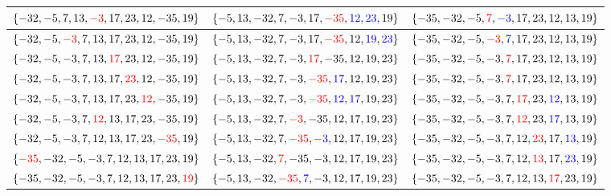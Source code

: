 \begin{longtable}{*{3}{|p{0.31\textwidth}}|}
\hline
\arrayfontsize $\{-32, -5, 7, 13, \textcolor{red}{-3}, 17, 23, 12, -35, 19\}$ & \arrayfontsize $\{-5, 13, -32, 7, -3, 17, \textcolor{red}{-35}, \textcolor{blue}{12}, \textcolor{blue}{23}, 19\}$ & \arrayfontsize $\{-35, -32, -5, \textcolor{red}{7}, \textcolor{blue}{-3}, 17, 23, 12, 13, 19\}$ \\
\hline
\arrayfontsize $\{-32, -5, \textcolor{red}{-3}, 7, 13, 17, 23, 12, -35, 19\}$ & \arrayfontsize $\{-5, 13, -32, 7, -3, 17, \textcolor{red}{-35}, 12, \textcolor{blue}{19}, \textcolor{blue}{23}\}$ & \arrayfontsize $\{-35, -32, -5, \textcolor{red}{-3}, \textcolor{blue}{7}, 17, 23, 12, 13, 19\}$ \\
\hline
\arrayfontsize $\{-32, -5, -3, 7, 13, \textcolor{red}{17}, 23, 12, -35, 19\}$ & \arrayfontsize $\{-5, 13, -32, 7, -3, \textcolor{red}{17}, -35, 12, 19, 23\}$ & \arrayfontsize $\{-35, -32, -5, -3, \textcolor{red}{7}, 17, 23, 12, 13, 19\}$ \\
\hline
\arrayfontsize $\{-32, -5, -3, 7, 13, 17, \textcolor{red}{23}, 12, -35, 19\}$ & \arrayfontsize $\{-5, 13, -32, 7, -3, \textcolor{red}{-35}, \textcolor{blue}{17}, 12, 19, 23\}$ & \arrayfontsize $\{-35, -32, -5, -3, \textcolor{red}{7}, 17, 23, 12, 13, 19\}$ \\
\hline
\arrayfontsize $\{-32, -5, -3, 7, 13, 17, 23, \textcolor{red}{12}, -35, 19\}$ & \arrayfontsize $\{-5, 13, -32, 7, -3, \textcolor{red}{-35}, \textcolor{blue}{12}, \textcolor{blue}{17}, 19, 23\}$ & \arrayfontsize $\{-35, -32, -5, -3, 7, \textcolor{red}{17}, 23, \textcolor{blue}{12}, 13, 19\}$ \\
\hline
\arrayfontsize $\{-32, -5, -3, 7, \textcolor{red}{12}, 13, 17, 23, -35, 19\}$ & \arrayfontsize $\{-5, 13, -32, 7, \textcolor{red}{-3}, -35, 12, 17, 19, 23\}$ & \arrayfontsize $\{-35, -32, -5, -3, 7, \textcolor{red}{12}, 23, \textcolor{blue}{17}, 13, 19\}$ \\
\hline
\arrayfontsize $\{-32, -5, -3, 7, 12, 13, 17, 23, \textcolor{red}{-35}, 19\}$ & \arrayfontsize $\{-5, 13, -32, 7, \textcolor{red}{-35}, \textcolor{blue}{-3}, 12, 17, 19, 23\}$ & \arrayfontsize $\{-35, -32, -5, -3, 7, 12, \textcolor{red}{23}, 17, \textcolor{blue}{13}, 19\}$ \\
\hline
\arrayfontsize $\{\textcolor{red}{-35}, -32, -5, -3, 7, 12, 13, 17, 23, 19\}$ & \arrayfontsize $\{-5, 13, -32, \textcolor{red}{7}, -35, -3, 12, 17, 19, 23\}$ & \arrayfontsize $\{-35, -32, -5, -3, 7, 12, \textcolor{red}{13}, 17, \textcolor{blue}{23}, 19\}$ \\
\hline
\arrayfontsize $\{-35, -32, -5, -3, 7, 12, 13, 17, 23, \textcolor{red}{19}\}$ & \arrayfontsize $\{-5, 13, -32, \textcolor{red}{-35}, \textcolor{blue}{7}, -3, 12, 17, 19, 23\}$ & \arrayfontsize $\{-35, -32, -5, -3, 7, 12, 13, \textcolor{red}{17}, 23, 19\}$ \\

\end{longtable}
